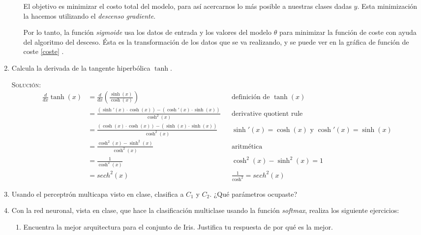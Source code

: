 \documentclass[letterpaper,11pt]{article}
\begin{document}
\begin{enumerate}
\begin{enumerate}
        El objetivo es minimizar el costo total del modelo, para así acercarnos
        lo más posible a nuestras clases dadas $y$. Esta minimización la 
        hacemos utilizando el \textit{descenso gradiente}. 

        Por lo tanto, la función \textit{sigmoide} usa los datos de entrada y 
        los valores del modelo $\theta$ para minimizar la función de coste con 
        ayuda del algoritmo del desceso. Ésta es la transformación de los 
        datos que se va realizando, y se puede ver en la gráfica de 
        función de coste \ref{coste} . 
    \end{enumerate}

    \newpage
    \item Calcula la derivada de la tangente hiperbólica $\tanh$.
    
    \textsc{Solución:}
    \begin{align*}
        \frac{d}{dx} \tanh (x) 
        &= \frac{d}{dx} \left(\frac{\sinh (x)}{\cosh (x)}\right)
        && \text{definición de $\tanh (x)$} \\
        &= \frac{(\sinh' (x) \cdot \cosh (x)) - (\cosh' (x) \cdot \sinh (x))}
                {\cosh^2 (x)}
        && \text{derivative quotient rule} \\ 
        &= \frac{(\cosh (x) \cdot \cosh (x)) - (\sinh (x) \cdot \sinh (x))}
                {\cosh^2 (x)}
        && \text{$\sinh' (x) = \cosh (x)$ y $\cosh' (x) = \sinh (x)$} \\ 
        &= \frac{\cosh^2 (x) - \sinh^2 (x)}{\cosh^2 (x)}
        && \text{aritmética} \\ 
        &= \frac{1}{\cosh^2 (x)}
        && \text{$\cosh^2 (x) - \sinh^2 (x) = 1$} \\ 
        &= sech^2 (x)
        && \text{$\frac{1}{\cosh^2} = sech^2 (x)$}
    \end{align*}

    \item Usando el perceptrón multicapa visto en clase, clasifica a $C_1$ y 
    $C_2$. ¿Qué parámetros ocupaste?

    \item Con la red neuronal, vista en clase, que hace la clasificación 
    multiclase usando la función \textit{softmax}, realiza los siguiente 
    ejercicios:
    \begin{enumerate}
        \item Encuentra la mejor arquitectura para el conjunto de Iris. 
        Justifica tu respuesta de por qué es la mejor.


\end{enumerate}
\end{enumerate}
\end{document}
